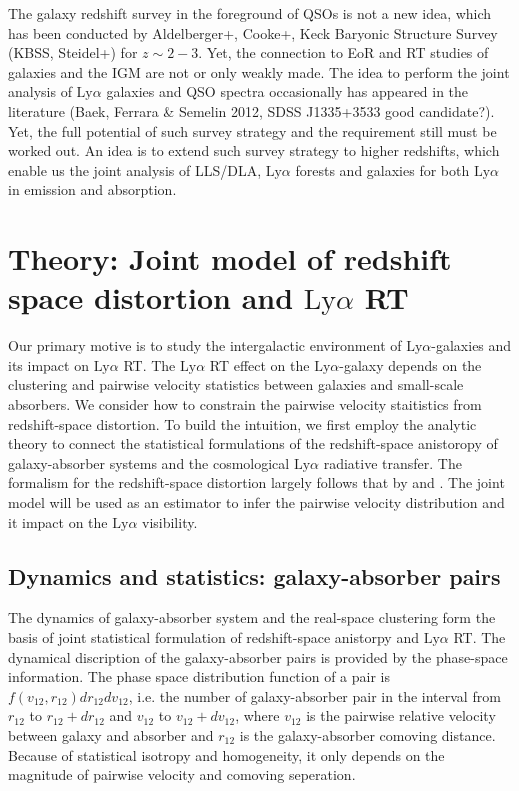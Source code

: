 \documentclass[useAMS,usenatbib,twocolumn]{mn2e}
\newcommand{\LyA}{\mbox{Ly}\alpha}
\begin{document}
The galaxy redshift survey in the foreground of QSOs is not a new
idea, which has been conducted by Aldelberger+, Cooke+, Keck Baryonic
Structure Survey (KBSS, Steidel+) for $z\sim2-3$. Yet, the connection
to EoR and RT studies of galaxies and the IGM are not or only weakly made.
The idea to perform the joint analysis of $\LyA$ galaxies and QSO spectra
occasionally has appeared in the literature (Baek, Ferrara \& Semelin 2012,
SDSS J1335+3533 good candidate?). Yet, the full potential of such survey
strategy and the requirement still must be worked out.
An idea is to extend such survey strategy to higher redshifts, which
enable us the joint analysis of LLS/DLA, $\LyA$ forests and galaxies for
both $\LyA$ in emission and absorption.



\section{Theory: Joint model of redshift space distortion and 
$\LyA$ RT}
Our primary motive is to study the intergalactic environment of $\LyA$-galaxies 
and its impact on $\LyA$ RT. The $\LyA$ RT effect on the $\LyA$-galaxy depends
on the clustering and pairwise velocity statistics between galaxies and
small-scale absorbers. We consider how to constrain the pairwise velocity
staitistics from redshift-space distortion. To build the intuition, 
we first employ the analytic theory
to connect the statistical formulations of the redshift-space 
anistoropy of galaxy-absorber systems and the cosmological $\LyA$ radiative 
transfer. The formalism for the redshift-space distortion largely follows
that by \cite{1994MNRAS.267..927F} and \cite{2011MNRAS.417.1913R}. 
The joint model will be used as an estimator to infer the pairwise velocity
distribution and it impact on the $\LyA$ visibility.

\subsection{Dynamics and statistics: galaxy-absorber pairs}
The dynamics of galaxy-absorber system and the real-space clustering form the
basis of joint statistical formulation of redshift-space anistorpy and 
$\LyA$ RT. The dynamical discription of the galaxy-absorber pairs
is provided by the phase-space information. The phase space distribution 
function of a pair is $f(v_{12},r_{12})dr_{12}dv_{12}$, i.e. the number of 
galaxy-absorber pair in the interval from $r_{12}$ to $r_{12}+dr_{12}$ 
and $v_{12}$ to $v_{12}+dv_{12}$, where $v_{12}$ is
the pairwise relative velocity between galaxy and absorber and $r_{12}$ is
the galaxy-absorber comoving distance. Because of statistical isotropy and
homogeneity, it only depends on the magnitude of pairwise velocity and
comoving seperation. 
\end{document}
